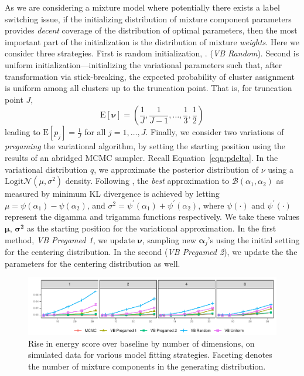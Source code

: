 As we are considering a mixture model where potentially there exists a label switching
    issue, if the initializing distribution of mixture component parameters provides
    \emph{decent} coverage of the distribution of optimal parameters, then the most 
    important part of the initialization is the distribution of mixture \emph{weights}.  
    Here we consider three strategies.  First is random initialization, 
    .
    (\emph{VB Random}).  Second is uniform initialization---initializing the variational 
    parameters such that, after transformation via stick-breaking, the expected probability 
    of cluster assignment is uniform among all clusters up to the truncation point. That 
    is, for truncation point $J$,
    \[
        \text{E}[\bm{\nu}] = \left(\frac{1}{J},\frac{1}{J-1},\ldots,\frac{1}{3},\frac{1}{2}\right)
    \]
    leading to $\text{E}[p_j] = \frac{1}{J}$ for all $j = 1,\ldots,J$.
    Finally, we consider two variations of \emph{pregaming} 
    the variational algorithm, by setting the starting position using the results of an 
    abridged MCMC sampler.  
    Recall Equation~\eqref{eqn:pdelta}. In the variational distribution $q$, we approximate the 
    posterior distribution of $\nu$ using a $\text{Logit}\mathcal{N}(\mu,\sigma^2)$ density.  
    Following \cite{aitchison1980}, the \emph{best} approximation to 
    $\mathcal{B}(\alpha_1,\alpha_2)$ as measured by minimum KL divergence is achieved by 
    letting $\mu = \psi(\alpha_1) - \psi(\alpha_2)$, and 
    $\sigma^2 = \psi^{\prime}(\alpha_1) + \psi^{\prime}(\alpha_2)$, where 
    $\psi(\cdot)$ and $\psi^{\prime}(\cdot)$ represent the digamma and trigamma functions 
    respectively.  We take these values $\bm{\mu}$, $\bm{\sigma^2}$ as the starting position for
    the variational approximation. In the first method, \emph{VB Pregamed 1}, 
    we update $\bm{\nu}$, sampling new $\bm{\alpha}_j$'s using the initial setting
    for the centering distribution.  In the second (\emph{VB Pregamed 2}), we update the
    the parameters for the centering distribution as well. 

\begin{figure}[htb]
    \caption{Rise in energy score over baseline by number of dimensions, on simulated data 
    for various model fitting strategies. Faceting denotes the number of mixture components 
    in the generating distribution. \label{fig:energyscore}}
    \includegraphics[width=\linewidth]{plots/energy_score}
\end{figure}

